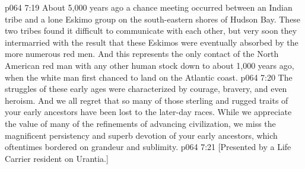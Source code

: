 \vs p064 7:19 About 5,000 years ago a chance meeting occurred between an Indian tribe and a lone Eskimo group on the south\hyp{}eastern shores of Hudson Bay. These two tribes found it difficult to communicate with each other, but very soon they intermarried with the result that these Eskimos were eventually absorbed by the more numerous red men. And this represents the only contact of the North American red man with any other human stock down to about 1,000 years ago, when the white man first chanced to land on the Atlantic coast.
\vs p064 7:20 \pc The struggles of these early ages were characterized by courage, bravery, and even heroism. And we all regret that so many of those sterling and rugged traits of your early ancestors have been lost to the later\hyp{}day races. While we appreciate the value of many of the refinements of advancing civilization, we miss the magnificent persistency and superb devotion of your early ancestors, which oftentimes bordered on grandeur and sublimity.
\vsetoff
\vs p064 7:21 [Presented by a Life Carrier resident on Urantia.]
